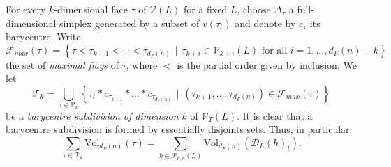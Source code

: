 \documentclass[11pt,a4paper,twoside]{amsart}
\theoremstyle{plain}
\theoremstyle{definition}
\newcommand{\perfect}[0]{\mathcal{P}_}
\newcommand{\vol}[0]{\mathrm{Vol}}
\begin{document}
For every $k$-dimensional face $\tau$ of $\mathcal{V}(L)$ for a fixed $L$, choose $\Delta_\tau$ a full-dimensional simplex generated by a subset of $v(\tau_t)$ and denote by $c_\tau$ its barycentre. Write
$$\mathcal{F}_{max}(\tau) = \left\{\tau < \tau_{k+1} < \cdots < \tau_{d_F(n)} \hspace{5pt}|\hspace{5pt} \tau_{k+i}\in \mathcal{V}_{k+i}(L) \text{ for all } i = 1,\dots, d_F(n)-k \right\}$$
the set of \textit{maximal flags} of $\tau$, where $<$ is the partial order given by inclusion. We let $$\mathcal{T}_k = \bigcup_{\tau\in\mathcal{V}_k}\left\{ \tau_t * c_{\tau_{k+1}}* \dots * c_{\tau_{d_F(n)}} \hspace{5pt} | \hspace{5pt} (\tau_{k+1},\dots,\tau_{d_F(n)})\in\mathcal{F}_{max}(\tau) \text{}\right\}$$ be a \textit{barycentre subdivision of dimension $k$} of $\mathcal{V}_T(L)$. It is clear that a barycentre subdivision is formed by essentially disjoints sets. Thus, in particular:
$$\sum_{\tau\in\mathcal{T}_k}\vol_{d_F(n)}(\tau) = \sum_{h\in \perfect {F,n}(L)} \vol_{d_F(n)}(\mathcal{D}_L(h)_t).$$
\end{document}
